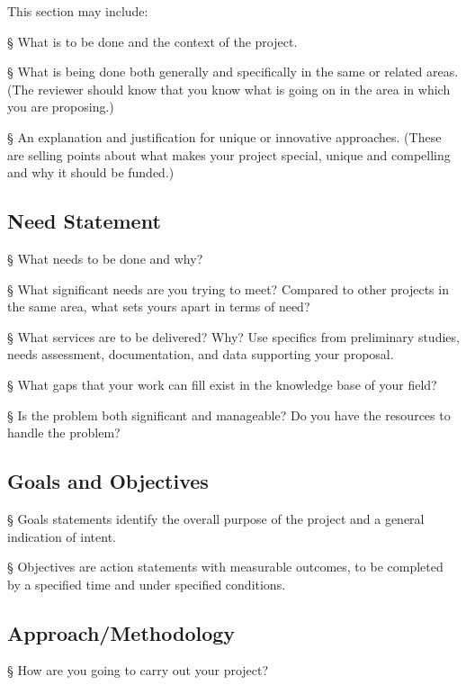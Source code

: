 This section may include:

§ What is to be done and the context of the project.

§ What is being done both generally and specifically in the same or
related areas. (The reviewer should know that you know what is going on
in the area in which you are proposing.)

§ An explanation and justification for unique or innovative approaches.
(These are selling points about what makes your project special, unique
and compelling and why it should be funded.)

\hypertarget{need-statement-1}{%
\subsection{Need Statement}\label{need-statement-1}}

§ What needs to be done and why?

§ What significant needs are you trying to meet? Compared to other
projects in the same area, what sets yours apart in terms of need?

§ What services are to be delivered? Why? Use specifics from preliminary
studies, needs assessment, documentation, and data supporting your
proposal.

§ What gaps that your work can fill exist in the knowledge base of your
field?

§ Is the problem both significant and manageable? Do you have the
resources to handle the problem?

\hypertarget{goals-and-objectives-1}{%
\subsection{Goals and Objectives}\label{goals-and-objectives-1}}

§ Goals statements identify the overall purpose of the project and a
general indication of intent.

§ Objectives are action statements with measurable outcomes, to be
completed by a specified time and under specified conditions.

\hypertarget{approachmethodology-1}{%
\subsection{Approach/Methodology}\label{approachmethodology-1}}

§ How are you going to carry out your project?

